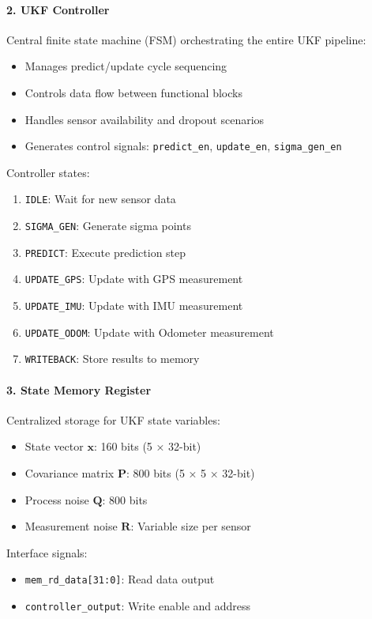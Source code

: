 \documentclass[12pt,a4paper]{report}
\begin{document}
\paragraph{2. UKF Controller}
Central finite state machine (FSM) orchestrating the entire UKF pipeline:
\begin{itemize}
    \item Manages predict/update cycle sequencing
    \item Controls data flow between functional blocks
    \item Handles sensor availability and dropout scenarios
    \item Generates control signals: \texttt{predict\_en}, \texttt{update\_en}, \texttt{sigma\_gen\_en}
\end{itemize}

Controller states:
\begin{enumerate}
    \item \texttt{IDLE}: Wait for new sensor data
    \item \texttt{SIGMA\_GEN}: Generate sigma points
    \item \texttt{PREDICT}: Execute prediction step
    \item \texttt{UPDATE\_GPS}: Update with GPS measurement
    \item \texttt{UPDATE\_IMU}: Update with IMU measurement
    \item \texttt{UPDATE\_ODOM}: Update with Odometer measurement
    \item \texttt{WRITEBACK}: Store results to memory
\end{enumerate}

\paragraph{3. State Memory Register}
Centralized storage for UKF state variables:
\begin{itemize}
    \item State vector $\mathbf{x}$: 160 bits (5 × 32-bit)
    \item Covariance matrix $\mathbf{P}$: 800 bits (5 × 5 × 32-bit)
    \item Process noise $\mathbf{Q}$: 800 bits
    \item Measurement noise $\mathbf{R}$: Variable size per sensor
\end{itemize}

Interface signals:
\begin{itemize}
    \item \texttt{mem\_rd\_data[31:0]}: Read data output
    \item \texttt{controller\_output}: Write enable and address
\end{itemize}
\end{document}

